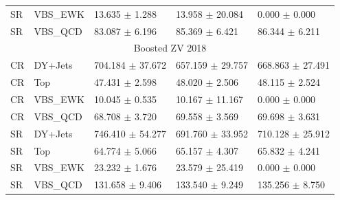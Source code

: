 \begin{table}
\begin{tabular}{lllll}
    SR     & VBS\_EWK & 13.635 \( \pm \) 1.288   & 13.958 \( \pm \) 20.084  & 0.000 \( \pm \) 0.000    \\
    SR     & VBS\_QCD & 83.087 \( \pm \) 6.196   & 85.369 \( \pm \) 6.421   & 86.344 \( \pm \) 6.211   \\
    \midrule
    \multicolumn{5}{c}{Boosted ZV 2018}                                                                \\
    \midrule
    CR     & DY+Jets  & 704.184 \( \pm \) 37.672 & 657.159 \( \pm \) 29.757 & 668.863 \( \pm \) 27.491 \\
    CR     & Top      & 47.431 \( \pm \) 2.598   & 48.020 \( \pm \) 2.506   & 48.115 \( \pm \) 2.524   \\
    CR     & VBS\_EWK & 10.045 \( \pm \) 0.535   & 10.167 \( \pm \) 11.167  & 0.000 \( \pm \) 0.000    \\
    CR     & VBS\_QCD & 68.708 \( \pm \) 3.720   & 69.558 \( \pm \) 3.569   & 69.698 \( \pm \) 3.631   \\
    SR     & DY+Jets  & 746.410 \( \pm \) 54.277 & 691.760 \( \pm \) 33.952 & 710.128 \( \pm \) 25.912 \\
    SR     & Top      & 64.774 \( \pm \) 5.066   & 65.157 \( \pm \) 4.307   & 65.832 \( \pm \) 4.241   \\
    SR     & VBS\_EWK & 23.232 \( \pm \) 1.676   & 23.579 \( \pm \) 25.419  & 0.000 \( \pm \) 0.000    \\
    SR     & VBS\_QCD & 131.658 \( \pm \) 9.406  & 133.540 \( \pm \) 9.249  & 135.256 \( \pm \) 8.750  \\
    \bottomrule
  \end{tabular}\label{tab:fit-values-zv}
\end{table}


